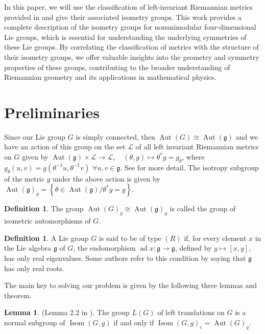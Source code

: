 \documentclass[12pt,a4paper,twoside]{article}
\theoremstyle{definition}
\newtheorem{definition}[theorem]{Definition}
\newtheorem{lemma}[theorem]{Lemma}
\begin{document}
\hspace*{3mm} In this paper, we will use the classification of left-invariant Riemannian metrics provided in \cite{aitbenhaddou2025classification} and give their associated isometry groups. This work provides a complete description of the isometry groups for nonunimodular four-dimensional Lie groups, which is essential for understanding the underlying symmetries of these Lie groups. By correlating the classification of metrics with the structure of their isometry groups, we offer valuable insights into the geometry and symmetry properties of these groups, contributing to the broader understanding of Riemannian geometry and its applications in mathematical physics.
\section{Preliminaries}
Since our Lie group $G$ is simply connected, then $\operatorname{Aut}(G) \cong \operatorname{Aut}(\mathfrak{g})$ \cite{warner} and we have an action of this group on the set $\mathscr{L}$ of all left invariant Riemannian metrics on $G$ given by
$\operatorname{Aut}(\mathfrak{g}) \times \mathscr{L} \longrightarrow \mathscr{L}, \quad (\theta, g) \longmapsto \theta^{\ast}g = g_{\theta}$, where $g_{\theta}(u, v) = g(\theta^{-1}u, \theta^{-1}v) \,\, \forall u, v\in \mathfrak{g}$. See \cite{ha2012isometry} for more detail. The isotropy subgroup of the metric $g$ under the above action is given by $\operatorname{Aut}(\mathfrak{g})_{g} = \left\lbrace \theta \in \operatorname{Aut}(\mathfrak{g}) / \theta^{\ast}g = g \right\rbrace.$
\begin{definition}
The group $\operatorname{Aut}(G)_g \cong \operatorname{Aut}(\mathfrak{g})_g$ is called the group of isometric automorphisms of $G$.
\end{definition}
\begin{definition}
A Lie group $G$ is said to be of type $(R)$ if, for every element $x$ in the Lie algebra $\mathfrak{g}$ of $G$, the endomorphism $\operatorname{ad} x : \mathfrak{g} \to \mathfrak{g}$, defined by $y \mapsto [x, y]$, has only real eigenvalues. Some authors refer to this condition by saying that $\mathfrak{g}$ has only real roots.
\end{definition}
The main key to solving our problem is given by the following three lemmas and theorem.
\begin{lemma} \label{normal} (Lemma 2.2 in \cite{ha2012isometry}). The group $L(G)$ of left translations on $G$ is a normal subgroup of $\operatorname{Isom}(G, g)$ if and only if $\operatorname{Isom}(G, g)_e = \operatorname{Aut}(G)_g$.
\end{lemma}
\end{document}
